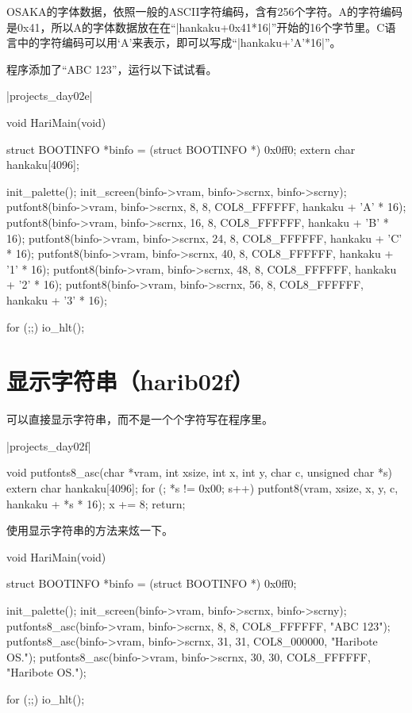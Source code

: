 \begin{code}[label=bootpack.c节选]
\cs

OSAKA的字体数据，依照一般的ASCII字符编码，含有256个字符。A的字符编码是0x41，所以A的字体数据放在在“|hankaku+0x41*16|”开始的16个字节里。C语言中的字符编码可以用‘A’来表示，即可以写成“|hankaku+'A'*16|”。

程序添加了“ABC 123”，运行以下试试看。

\dag|projects_day\harib02e|
\begin{code}[label=bootpack.c]
void HariMain(void)
{
	struct BOOTINFO *binfo = (struct BOOTINFO *) 0x0ff0;
	extern char hankaku[4096];

	init_palette();
	init_screen(binfo->vram, binfo->scrnx, binfo->scrny);
	putfont8(binfo->vram, binfo->scrnx,  8, 8, COL8_FFFFFF, hankaku + 'A' * 16);
	putfont8(binfo->vram, binfo->scrnx, 16, 8, COL8_FFFFFF, hankaku + 'B' * 16);
	putfont8(binfo->vram, binfo->scrnx, 24, 8, COL8_FFFFFF, hankaku + 'C' * 16);
	putfont8(binfo->vram, binfo->scrnx, 40, 8, COL8_FFFFFF, hankaku + '1' * 16);
	putfont8(binfo->vram, binfo->scrnx, 48, 8, COL8_FFFFFF, hankaku + '2' * 16);
	putfont8(binfo->vram, binfo->scrnx, 56, 8, COL8_FFFFFF, hankaku + '3' * 16);

	for (;;) {
		io_hlt();
	}
}
\end{code}
\section{	显示字符串（harib02f）	}
可以直接显示字符串，而不是一个个字符写在程序里。

\dag|projects_day\harib02f|
\begin{code}[label=bootpack.c]
void putfonts8_asc(char *vram, int xsize, int x, int y, char c, unsigned char *s)
{
	extern char hankaku[4096];
	for (; *s != 0x00; s++) {
		putfont8(vram, xsize, x, y, c, hankaku + *s * 16);
		x += 8;
	}
	return;
}
\end{code}

使用显示字符串的方法来炫一下。
\begin{code}[label=bootpack.c]
void HariMain(void)
{
	struct BOOTINFO *binfo = (struct BOOTINFO *) 0x0ff0;

	init_palette();
	init_screen(binfo->vram, binfo->scrnx, binfo->scrny);
	putfonts8_asc(binfo->vram, binfo->scrnx,  8,  8, COL8_FFFFFF, "ABC 123");
	putfonts8_asc(binfo->vram, binfo->scrnx, 31, 31, COL8_000000, "Haribote OS.");
	putfonts8_asc(binfo->vram, binfo->scrnx, 30, 30, COL8_FFFFFF, "Haribote OS.");

	for (;;) {
		io_hlt();
	}
}
\end{code}

\end{code}
